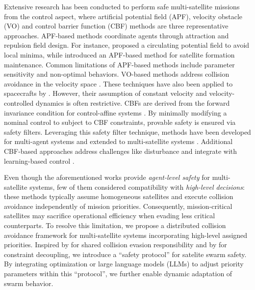 \documentclass{ifacconf}
\begin{document}
\par Extensive research has been conducted to perform safe multi-satellite missions from the control aspect, where artificial potential field (APF), velocity obstacle (VO) and control barrier function (CBF) methods are three representative approaches.
APF-based methods coordinate agents through attraction and repulsion field design. 
For instance, \cite{Hwang2022APF} proposed a circulating potential field to avoid local minima, while \cite{Guan2024APF} introduced an APF-based method for satellite formation maintenance.
Common limitations of APF-based methods include parameter sensitivity and non-optimal behaviors. 
VO-based methods address collision avoidance in the velocity space \cite[]{Douthwaite2019VO}. 
These techniques have also been applied to spacecrafts by \cite{Li2025ELVO}.
However, their assumption of constant velocity and velocity-controlled dynamics is often restrictive.
CBFs are derived from the forward invariance condition for control-affine systems \cite[]{Ames2019CBFreview}. 
By minimally modifying a nominal control to subject to CBF constraints, provable safety is ensured via safety filters.
Leveraging this safety filter technique, methods have been developed for multi-agent systems \cite[]{Borrmann2015CBFswarm} and extended to multi-satellite systems \cite[]{Hibbard2022CBFspacecraft}. 
Additional CBF-based approaches address challenges like disturbance  \cite[]{Cheng2020CBFDisturbance} and integrate with learning-based control \cite[]{Liu2024RLFlocking}.

\par Even though the aforementioned works provide \textit{agent-level safety} for multi-satellite systems, few of them considered compatibility with \textit{high-level decisions}:
these methods typically assume homogeneous satellites and execute collision avoidance independently of mission priorities. Consequently, mission-critical satellites may sacrifice operational efficiency when evading less critical counterparts.
To resolve this limitation, we propose a distributed collision avoidance framework for multi-satellite systems incorporating high-level assigned priorities.
Inspired by \cite{Berg2011ORCA} for shared collision evasion responsibility and by \cite{Chen2021Backup} for constraint decoupling, we introduce a ``safety protocol'' for satelite swarm safety. 
By integrating optimization or large language models (LLMs) to adjust priority parameters within this ``protocol'', we further enable dynamic adaptation of swarm behavior.
\end{document}

